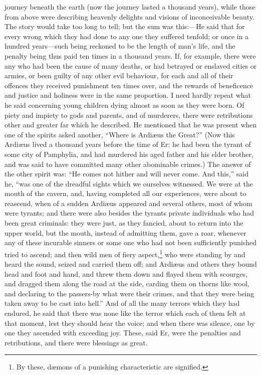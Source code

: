 \documentclass[12pt]{article}
\begin{document}
journey beneath the earth (now the journey lasted a thousand years), while
those from above were describing heavenly delights and visions of inconceivable
beauty. The story would take too long to tell; but the sum was this:---He said
that for every wrong which they had done to any one they suffered tenfold; or
once in a hundred years---such being reckoned to be the length of man's life,
and the penalty being thus paid ten times in a thousand years. If, for example,
there were any who had been the cause of many deaths, or had betrayed or
enslaved cities or armies, or been guilty of any other evil behaviour, for each
and all of their offences they received punishment ten times over, and the
rewards of beneficence and justice and holiness were in the same proportion. I
need hardly repeat what he said concerning young children dying almost as soon
as they were born. Of piety and impiety to gods and parents, and of murderers,
there were retributions other and greater far which he described. He mentioned
that he was present when one of the spirits asked another, ``Where is
Ardi{\ae}us the Great?'' (Now this Ardi{\ae}us lived a thousand years before
the time of Er: he had been the tyrant of some city of Pamphylia, and had
murdered his aged father and his elder brother, and was said to have committed
many other abominable crimes.) The answer of the other spirit was: ``He comes
not hither and will never come. And this,'' said he, ``was one of the dreadful
sights which we ourselves witnessed. We were at the mouth of the cavern, and,
having completed all our experiences, were about to reascend, when of a sudden
Ardi{\ae}us appeared and several others, most of whom were tyrants; and there
were also besides the tyrants private individuals who had been great criminals:
they were just, as they fancied, about to return into the upper world, but the
mouth, instead of admitting them, gave a roar, whenever any of these incurable
sinners or some one who had not been sufficiently punished tried to ascend; and
then wild men of fiery aspect,\footnote{By these, d{\ae}mons of a punishing
characteristic are signified.} who were standing by and heard the sound, seized
and carried them off; and Ardi{\ae}us and others they bound head and foot and
hand, and threw them down and flayed them with scourges, and dragged them along
the road at the side, carding them on thorns like wool, and declaring to the
passers-by what were their crimes, and that they were being taken away to be
cast into hell.'' And of all the many terrors which they had endured, he said
that there was none like the terror which each of them felt at that moment,
lest they should hear the voice; and when there was silence, one by one they
ascended with exceeding joy. These, said Er, were the penalties and
retributions, and there were blessings as great.
\end{document}
